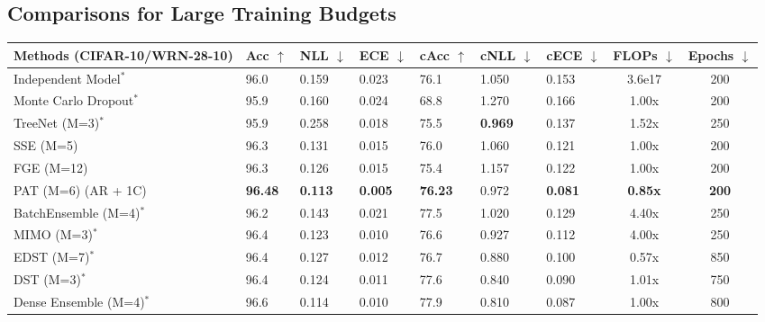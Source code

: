\documentclass[letterpaper]{article} %
\begin{document}
\subsection{Comparisons for Large Training Budgets}

\begin{table}[t]
\begin{tabularx}{\textwidth}{X l l l l l l c c}
\toprule
Methods (CIFAR-10/WRN-28-10) & Acc $\uparrow$ & NLL $\downarrow$ & ECE $\downarrow$ & cAcc $\uparrow$ & cNLL $\downarrow$ & cECE $\downarrow$ & FLOPs $\downarrow$ & Epochs $\downarrow$ \\
\midrule
Independent Model$^*$ & 96.0 & 0.159 & 0.023 & 76.1 & 1.050 & 0.153 & 3.6e17 & 200 \\
Monte Carlo Dropout$^*$ & 95.9 & 0.160 & 0.024 & 68.8 & 1.270 & 0.166 & 1.00x & 200 \\
TreeNet (M=3)$^*$ & 95.9 & 0.258 & 0.018 & 75.5 & {\bf 0.969} & 0.137 & 1.52x & 250 \\
SSE (M=5) & 96.3 & 0.131 & 0.015 & 76.0 & 1.060 & 0.121 & 1.00x & 200 \\
FGE (M=12) & 96.3 & 0.126 & 0.015 & 75.4 & 1.157 & 0.122 & 1.00x & 200 \\
PAT (M=6) (AR + 1C) & {\bf 96.48} & {\bf 0.113} & {\bf 0.005} & {\bf 76.23} & 0.972 & {\bf 0.081} & {\bf 0.85x} & {\bf 200} \\
\midrule
BatchEnsemble (M=4)$^*$ & 96.2 & 0.143 & 0.021 & 77.5 & 1.020 & 0.129 & 4.40x & 250 \\
MIMO (M=3)$^*$ & 96.4 & 0.123 & 0.010 & 76.6 & 0.927 & 0.112 & 4.00x & 250 \\
EDST (M=7)$^*$ & 96.4 & 0.127 & 0.012 & 76.7 & 0.880 & 0.100 & 0.57x & 850 \\
DST (M=3)$^*$ & 96.4 & 0.124 & 0.011 & 77.6 & 0.840 & 0.090 & 1.01x & 750 \\
Dense Ensemble (M=4)$^*$ & 96.6 & 0.114 & 0.010 & 77.9 & 0.810 & 0.087 & 1.00x & 800 \\
\bottomrule
\end{tabularx}

\vspace{0.2in}



\end{table}
\end{document}
